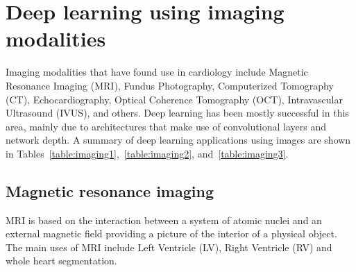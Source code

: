\documentclass[journal]{IEEEtran}
\begin{document}
\section{Deep learning using imaging modalities}
\label{sec:imaging}
Imaging modalities that have found use in cardiology include Magnetic Resonance Imaging (MRI), Fundus Photography, Computerized Tomography (CT), Echocardiography, Optical Coherence Tomography (OCT), Intravascular Ultrasound (IVUS), and others.
Deep learning has been mostly successful in this area, mainly due to architectures that make use of convolutional layers and network depth.
A summary of deep learning applications using images are shown in Tables~\ref{table:imaging1},~\ref{table:imaging2}, and~\ref{table:imaging3}.

\subsection{Magnetic resonance imaging}
MRI is based on the interaction between a system of atomic nuclei and an external magnetic field providing a picture of the interior of a physical object\cite{sebastiani1991mathematical}.
The main uses of MRI include Left Ventricle (LV), Right Ventricle (RV) and whole heart segmentation.
\end{document}
